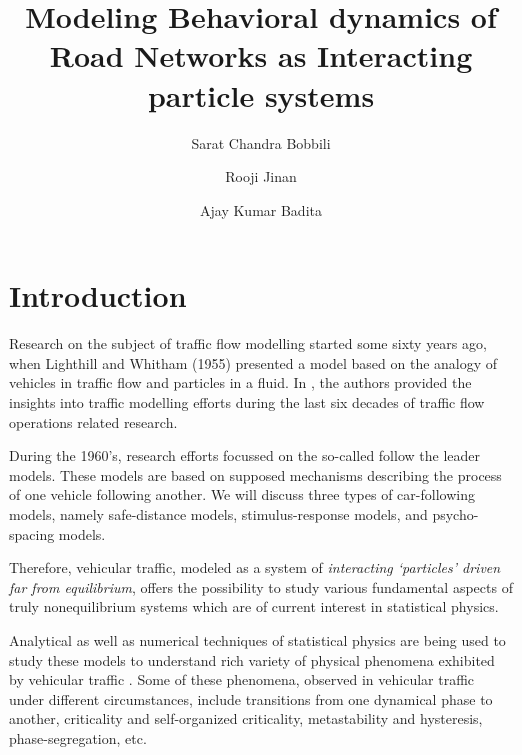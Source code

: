 \documentclass[a4paper,12pt]{scrartcl}
\date{}
\begin{document}
\title{Modeling Behavioral dynamics of Road Networks as Interacting particle systems}
\author{
Sarat Chandra Bobbili\\
\and
Rooji Jinan\\
\and
Ajay Kumar Badita\\
}
\maketitle


\section{Introduction}
Research on the subject of traffic flow modelling started some sixty years ago, when Lighthill and
Whitham (1955) presented a model based on the analogy of vehicles in traffic flow and particles in a
fluid.
In \cite{hoogendoorn2001JSCE}, the authors provided the insights into traffic modelling efforts during the last six decades of traffic flow operations related research.

During the 1960’s, research efforts focussed on the so-called follow the leader models. These models
are based on supposed mechanisms describing the process of one vehicle following another. We will
discuss three types of car-following models, namely safe-distance models, stimulus-response models,
and psycho-spacing models.

Therefore, vehicular traffic, modeled as a system of \emph{interacting ‘particles' driven far from equilibrium}, offers the possibility to study various fundamental aspects of truly nonequilibrium systems which are of current interest in statistical physics.

Analytical as well as numerical techniques of statistical physics are being used to study these models to understand rich variety of physical phenomena exhibited by vehicular traffic .
Some of these phenomena, observed in vehicular traffic under different circumstances, include transitions from one dynamical phase to another, criticality and self-organized criticality, metastability and hysteresis, phase-segregation, etc. 
\end{document}
